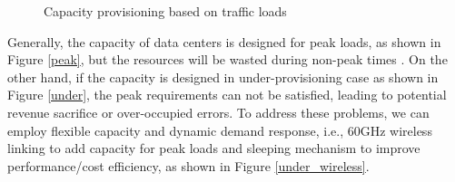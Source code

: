\documentclass[journal,onecolumn,11pt]{IEEEtran}
\begin{document}
\begin{figure}[!htp]
\centerline{
}
\caption{Capacity provisioning based on traffic loads}
\label{provisioning}
\end{figure}

Generally, the capacity of data centers is designed for peak loads, as shown in Figure \ref{peak}, but the resources will be wasted during non-peak times \cite{Armbrust:2010:VCC:1721654.1721672}. On the other hand, if the capacity is designed in under-provisioning case as shown in Figure \ref{under}, the peak requirements can not be satisfied, leading to potential revenue sacrifice or over-occupied errors. To address these problems, we can employ flexible capacity and dynamic demand response, i.e., 60GHz wireless linking to add capacity for peak loads and sleeping mechanism to improve performance/cost efficiency, as shown in Figure \ref{under_wireless}.
\end{document}
